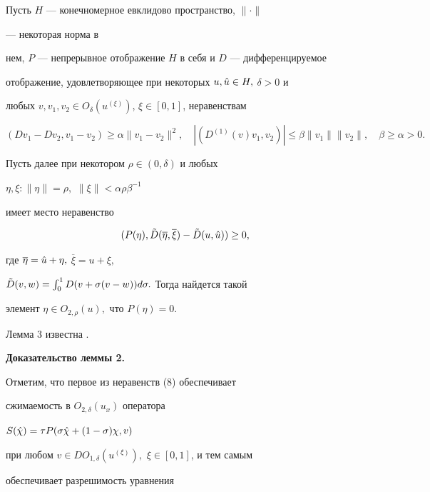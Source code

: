 \begin{lem} Пусть $H$ --- конечномерное евклидово пространство, $\|\cdot\|$ 


--- некоторая норма в 


нем, $P$ --- непрерывное отображение $H$ в себя и $D$ --- дифференцируемое 


отображение, удовлетворяющее при некоторых $u,\Hat u\in H,$ $\delta >0$ и 


любых $v,v_1,v_2\in O_\delta(u^{(\xi)})$, $\xi\in[0,1]$, неравенствам 


$$ 


(Dv_1-Dv_2, v_1-v_2) \ge \alpha\|v_1-v_2\|^2,\quad 


|(D^{(1)}(v)v_1,v_2)| \le \beta\|v_1\|\|v_2\|, \quad \beta \ge \alpha >0. 


$$ 


 


Пусть далее при некотором $\rho\in(0,\delta)$ и любых 


$\eta,\xi :\|\eta\|=\rho,$ $\|\xi\|< \alpha \rho \beta^{-1}$ 


имеет место неравенство 


$$ 


(P(\eta),\Tilde D(\overline \eta, \overline \xi)-\Tilde D 


(u,\Hat u)) \ge 0, 


$$ 


где $\overline\eta =\Hat u+\eta,$ $\overline\xi=u+\xi,$ 


$\Tilde D(v,w)=\int^1_0D(v+\sigma(v-w))d\sigma.$ Тогда найдется такой 


элемент $\eta\in O_{2,\rho}(u),$ что $P(\eta)=0.$ 


\end{lem} 


 


Лемма 3 известна \cite{Fed2}. 


 


{\bf Доказательство леммы 2.}


Отметим, что первое из неравенств (8) обеспечивает 


сжимаемость в $O_{2,\delta}(u_x)$ оператора 


$S(\Hat \chi)=\tau P(\sigma\Hat \chi +(1-\sigma)\chi,v)$ 


при любом $v\in DO_{1,\delta}(u^{(\xi)}),$ $\xi\in[0,1]$, и тем самым 


обеспечивает разрешимость уравнения 


